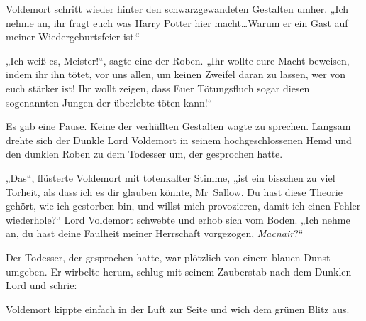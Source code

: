 Voldemort schritt wieder hinter den schwarzgewandeten Gestalten umher.
„Ich nehme an, ihr fragt euch was Harry Potter hier macht…Warum er ein Gast auf meiner Wiedergeburtsfeier ist.“

„Ich weiß es, Meister!“, sagte eine der Roben. „Ihr wollte eure Macht beweisen, indem ihr ihn tötet, vor uns allen, um keinen Zweifel daran zu lassen, wer von euch stärker ist! Ihr wollt zeigen, dass Euer Tötungsfluch sogar diesen sogenannten Jungen-der-überlebte töten kann!“

Es gab eine Pause.
Keine der verhüllten Gestalten wagte zu sprechen.
Langsam drehte sich der Dunkle Lord Voldemort in seinem hochgeschlossenen Hemd und den dunklen Roben zu dem Todesser um, der gesprochen hatte.

„Das“, flüsterte Voldemort mit totenkalter Stimme, „ist ein bisschen zu viel Torheit, als dass ich es dir glauben könnte, Mr~Sallow. Du hast diese Theorie gehört, wie ich gestorben bin, und willst mich provozieren, damit ich einen Fehler wiederhole?“
Lord Voldemort schwebte und erhob sich vom Boden.
„Ich nehme an, du hast deine Faulheit meiner Herrschaft vorgezogen, \emph{Macnair}?“

Der Todesser, der gesprochen hatte, war plötzlich von einem blauen Dunst umgeben. Er wirbelte herum, schlug mit seinem Zauberstab nach dem Dunklen Lord und schrie: 

Voldemort kippte einfach in der Luft zur Seite und wich dem grünen Blitz aus.

